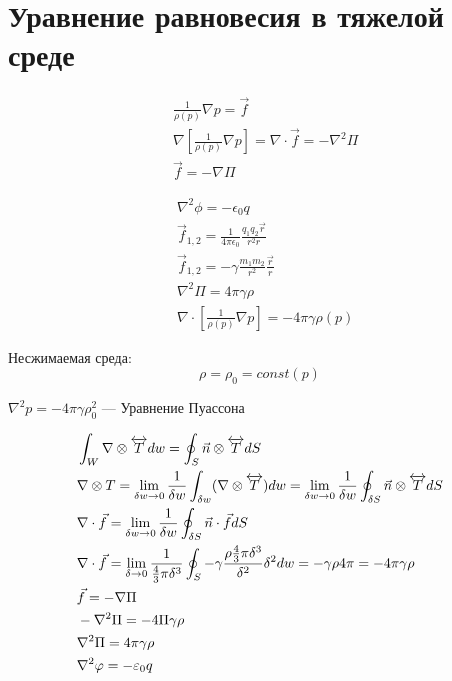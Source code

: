 \section{Уравнение равновесия в тяжелой среде}
\begin{align*}
  &\frac{1}{\rho(p)} \nabla p = \vec{f} \\
  &\nabla [\frac{1}{\rho(p)} \nabla p] = \nabla \cdot \vec{f}= -\nabla^2 \Pi \\
  &\vec{f} = -\nabla \Pi
\end{align*}

\begin{align*}
  &\nabla^2 \phi = - \epsilon_0 q\\
  &\vec{f}_{1, 2} = \frac{1}{4 \pi \epsilon_0} \frac{q_1 q_2 \vec{r}}{r^2 r} \\
  &\vec{f}_{1, 2} = -\gamma \frac{m_1 m_2}{r^2} \frac{\vec{r}}{r} \\
  &\nabla^2 \Pi = 4 \pi \gamma \rho \\
  &\nabla \cdot [ \frac{1}{\rho(p)} \nabla p] = -4 \pi \gamma \rho(p)
\end{align*}

Несжимаемая среда:
\[
  \rho = \rho_0 = const(p) 
\]

\begin{defn}
  $\nabla^2 p = - 4 \pi \gamma \rho_0^2$ --- Уравнение Пуассона
\end{defn}

\begin{thm}
  \begin{align*}
    &\int_W \nabla \otimes \overleftrightarrow{T} dw = \oint_S \vec{n} \otimes \overleftrightarrow{T} dS \\
    &\nabla \otimes T = \lim_{\delta w \to 0} \frac{1}{\delta w} \int_{\delta w} (\nabla \otimes \overleftrightarrow{T}) dw = \lim_{\delta w \to 0} \frac{1}{\delta w} \oint_{\delta S} \vec{n} \otimes \overleftrightarrow{T} d S\\
    & \nabla \cdot \vec{f} = \lim_{\delta w \to 0} \frac{1}{\delta w} \oint_{\delta S} \vec{n} \cdot \vec{f} d S\\
    &\nabla \cdot \vec{f} = \lim_{\delta \to 0} \frac{1}{\frac 43 \pi \delta^3} \oint_S -\gamma \frac{\rho \frac 43 \pi \delta^3}{\delta^2} \delta^2 dw = -\gamma \rho 4 \pi = -4 \pi \gamma \rho \\
    &\vec{f} = -\nabla \Pi \\
    &-\nabla^2 \Pi = - 4\Pi \gamma \rho\\
    &\nabla^2 \Pi = 4 \pi \gamma \rho\\
    &\nabla^2 \varphi = -\varepsilon_0 q
  \end{align*}
\end{thm}

